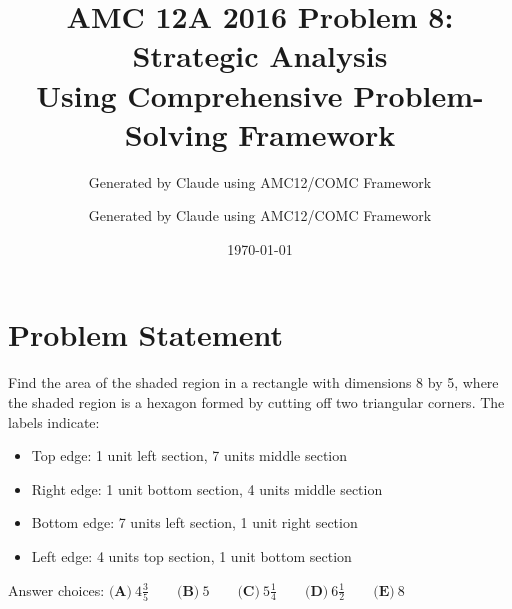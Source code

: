 \documentclass[11pt]{article}
\title{\textbf{AMC 12A 2016 Problem 8: Strategic Analysis}\\ \large Using Comprehensive Problem-Solving Framework}
\author{Generated by Claude using AMC12/COMC Framework}
\author{Generated by Claude using AMC12/COMC Framework}
\date{\today}
\begin{document}
\maketitle

\section*{Problem Statement}

Find the area of the shaded region in a rectangle with dimensions 8 by 5, where the shaded region is a hexagon formed by cutting off two triangular corners. The labels indicate:
\begin{itemize}
    \item Top edge: 1 unit left section, 7 units middle section
    \item Right edge: 1 unit bottom section, 4 units middle section
    \item Bottom edge: 7 units left section, 1 unit right section
    \item Left edge: 4 units top section, 1 unit bottom section
\end{itemize}

Answer choices: $\textbf{(A)}\ 4\frac{3}{5} \qquad \textbf{(B)}\ 5\qquad \textbf{(C)}\ 5\frac{1}{4} \qquad \textbf{(D)}\ 6\frac{1}{2} \qquad \textbf{(E)}\ 8$
\end{document}
